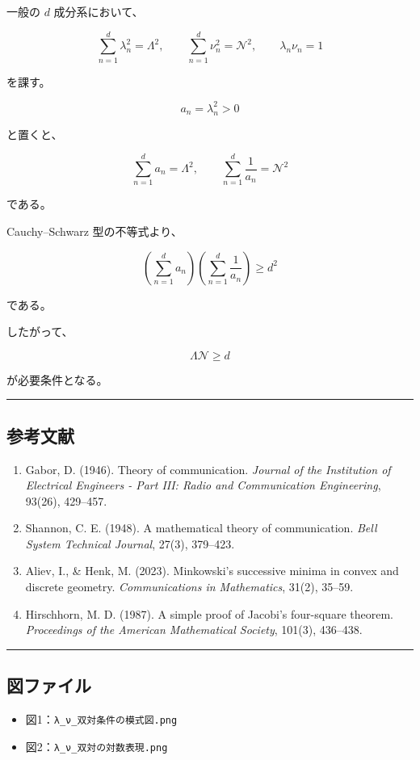 \documentclass[
]{ltjsarticle}
\providecommand{\tightlist}{%
  \setlength{\itemsep}{0pt}\setlength{\parskip}{0pt}}
\begin{document}
一般の \(d\) 成分系において、

\[
\sum_{n=1}^{d} \lambda_n^2=\Lambda^2,\qquad
\sum_{n=1}^{d} \nu_n^2=\mathcal{N}^2,\qquad
\lambda_n\nu_n=1
\]

を課す。

\[
a_n=\lambda_n^2>0
\]

と置くと、

\[
\sum_{n=1}^{d} a_n=\Lambda^2,\qquad
\sum_{n=1}^{d} \frac{1}{a_n}=\mathcal{N}^2
\]

である。

Cauchy--Schwarz 型の不等式より、

\[
\left(\sum_{n=1}^{d} a_n\right)
\left(\sum_{n=1}^{d} \frac{1}{a_n}\right)\ge d^2
\]

である。

したがって、

\[
\Lambda\mathcal{N}\ge d
\]

が必要条件となる。

\begin{center}\rule{0.5\linewidth}{0.5pt}\end{center}

\subsection{参考文献}\label{ux53c2ux8003ux6587ux732e}

\begin{enumerate}
\def\labelenumi{\arabic{enumi}.}
\item
  Gabor, D. (1946). Theory of communication. \emph{Journal of the
  Institution of Electrical Engineers - Part III: Radio and
  Communication Engineering}, 93(26), 429--457.
\item
  Shannon, C. E. (1948). A mathematical theory of communication.
  \emph{Bell System Technical Journal}, 27(3), 379--423.
\item
  Aliev, I., \& Henk, M. (2023). Minkowski's successive minima in convex
  and discrete geometry. \emph{Communications in Mathematics}, 31(2),
  35--59.
\item
  Hirschhorn, M. D. (1987). A simple proof of Jacobi's four-square
  theorem. \emph{Proceedings of the American Mathematical Society},
  101(3), 436--438.
\end{enumerate}

\begin{center}\rule{0.5\linewidth}{0.5pt}\end{center}

\subsection{図ファイル}\label{ux56f3ux30d5ux30a1ux30a4ux30eb}

\begin{itemize}
\tightlist
\item
  図1：\texttt{λ\_ν\_双対条件の模式図.png}
\item
  図2：\texttt{λ\_ν\_双対の対数表現.png}
\end{itemize}
\end{document}
